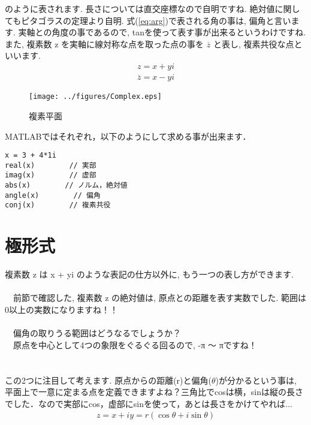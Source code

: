 \documentclass[11pt,a4paper]{ujreport}
\begin{document}
のように表されます. 長さについては直交座標なので自明ですね. 絶対値に関してもピタゴラスの定理より自明. 式(\ref{eq:arg})で表される角の事は, 偏角と言います. 実軸との角度の事であるので, tanを使って表す事が出来るというわけですね.\\

また, 複素数 z を実軸に線対称な点を取った点の事を $ \overline{z}$ と表し, 複素共役な点といいます.\\

\begin{eqnarray}
\label{eq:conj}
z = x + yi
\end{eqnarray}
\begin{eqnarray}
\overline{z} = x - yi
\end{eqnarray}

\begin{figure}[H]
\label{im:complex}
  \centering
  \texttt{[image: ../figures/Complex.eps]}
  \caption{複素平面}
\end{figure}
MATLABではそれぞれ，以下のようにして求める事が出来ます．

\begin{lstlisting}[caption=式(\ref{eq:vector}\ref{eq:conj})あたりのコード,label=sc:vector]
x = 3 + 4*1i
real(x)        // 実部
imag(x)        // 虚部
abs(x)        // ノルム，絶対値
angle(x)        // 偏角
conj(x)        // 複素共役
\end{lstlisting}

\section{極形式}
複素数 z は x + yi のような表記の仕方以外に, もう一つの表し方ができます.\\
\\
　前節で確認した, 複素数 z の絶対値は, 原点との距離を表す実数でした. 範囲は0以上の実数になりますね！！\\
\\
　偏角の取りうる範囲はどうなるでしょうか？\\
　原点を中心として4つの象限をぐるぐる回るので, -π ～ πですね！\\
\\
\\
この2つに注目して考えます. 原点からの距離(r)と偏角($\theta$)が分かるという事は, 平面上で一意に定まる点を定義できますよね？三角比でcosは横，sinは縦の長さでした．なので実部にcos，虚部にsinを使って，あとは長さをかけてやれば...
\begin{eqnarray}
z = x + iy = r(\cos \theta + i\sin \theta)
\label{eq:kyoku}
\end{eqnarray}
\end{document}
